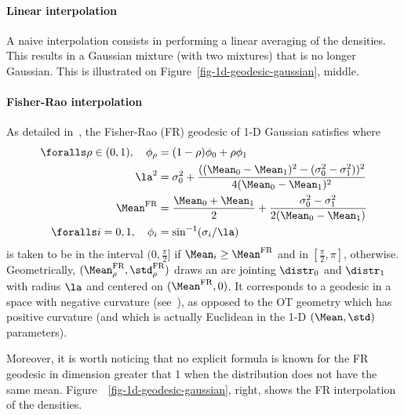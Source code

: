 \paragraph{Linear interpolation} A naive interpolation consists in performing a linear averaging of the densities. This results in a Gaussian mixture (with two mixtures) that is no longer Gaussian. This is illustrated on Figure~\ref{fig-1d-geodesic-gaussian}, middle.



\paragraph{Fisher-Rao interpolation} As detailed in~\cite{atkinson-rao}, the Fisher-Rao (FR) geodesic of 1-D Gaussian satisfies 
where
\begin{align*}
	\foralls \rho \in (0,1), \quad \phi_\rho &= (1-\rho) \phi_0 + \rho \phi_1 \\
	\la^2 &= \sigma_0^2 + \frac{((\Mean_0- \Mean_1)^2 - (\sigma_0^2 - \sigma_1^2))^2}{4(\Mean_0- \Mean_1)^2}  \\
	\Mean^{\text{FR}} &= \frac{\Mean_0 + \Mean_1}{2} + \frac{\sigma_0^2 - \sigma_1^2}{2(\Mean_0- \Mean_1)}  \\
	\foralls i=0, 1, \quad \phi_i & = \sin^{-1}(\sigma_i / \la)
\end{align*}
is taken to be in the interval $(0, \frac{\pi}{2}]$ if $\Mean_i \geq \Mean^{\text{FR}}$ and in $[\frac{\pi}{2}, \pi]$, otherwise.
Geometrically, $(\Mean_\rho^{\text{FR}},\std_\rho^{\text{FR}})$ draws an arc jointing $\distr_0$ and $\distr_1$ with radius $\la$ and centered on $(\Mean^{\text{FR}}, 0)$. It corresponds to a geodesic in a space with negative curvature (see~\cite{amari-book}), as opposed to the OT geometry which has positive curvature (and which is actually Euclidean in the 1-D $(\Mean,\std)$ parameters). 

Moreover, it is worth noticing that no explicit formula is known for the FR geodesic in dimension greater that 1 when the distribution does not have the same mean. Figure~~\ref{fig-1d-geodesic-gaussian}, right, shows the FR interpolation of the densities. 



